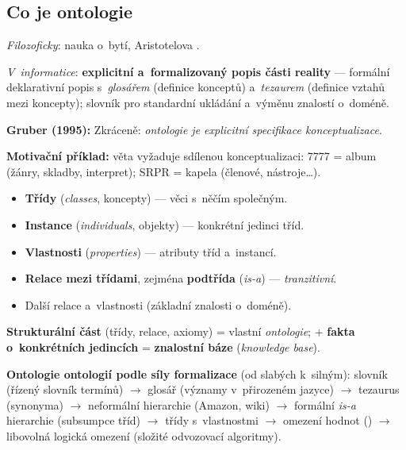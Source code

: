 \documentclass[11pt,a4paper]{article}
\theoremstyle{definition}
\begin{document}
\subsection{Co je ontologie}

\begin{defbox}[Ontologie]
\emph{Filozoficky}: nauka o~bytí, Aristotelova .

\emph{V~informatice}: \textbf{explicitní a~formalizovaný popis části reality} --- formální
deklarativní popis s~\emph{glosářem} (definice konceptů) a~\emph{tezaurem} (definice vztahů
mezi koncepty); slovník pro standardní ukládání a~výměnu znalostí o~doméně.

\textbf{Gruber (1995):} 
Zkráceně: \emph{ontologie je explicitní specifikace konceptualizace}.
\end{defbox}

\textbf{Motivační příklad:} věta  vyžaduje sdílenou
konceptualizaci: 7777 = album (žánry, skladby, interpret); SRPR = kapela (členové, nástroje\dots).

\begin{defbox}
\begin{itemize}
\item \textbf{Třídy} (\emph{classes}, koncepty) --- věci s~něčím společným.
\item \textbf{Instance} (\emph{individuals}, objekty) --- konkrétní jedinci tříd.
\item \textbf{Vlastnosti} (\emph{properties}) --- atributy tříd a~instancí.
\item \textbf{Relace mezi třídami}, zejména \textbf{podtřída} (\emph{is-a}) --- \emph{tranzitivní}.
\item Další relace a~vlastnosti (základní znalosti o~doméně).
\end{itemize}
\textbf{Strukturální část} (třídy, relace, axiomy) = vlastní \emph{ontologie};
+ \textbf{fakta o~konkrétních jedincích} = \textbf{znalostní báze} (\emph{knowledge base}).
\end{defbox}

\textbf{Ontologie ontologií podle síly formalizace} (od slabých k~silným):
slovník (řízený slovník termínů) $\to$ glosář (významy v~přirozeném jazyce)
$\to$ tezaurus (synonyma) $\to$ neformální hierarchie (Amazon, wiki) $\to$
formální \emph{is-a} hierarchie (subsumpce tříd) $\to$ třídy s~vlastnostmi $\to$
omezení hodnot () $\to$ libovolná logická omezení
(složité odvozovací algoritmy).
\end{document}
